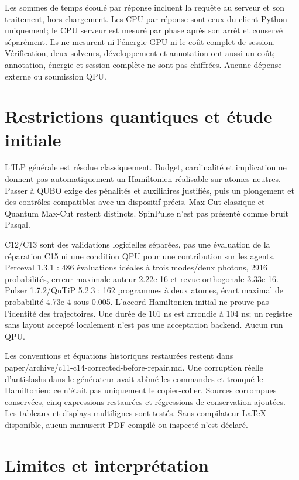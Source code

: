 \documentclass[11pt]{article}
\begin{document}
Les sommes de temps écoulé par réponse incluent la requête au serveur et son traitement, hors chargement. Les CPU par réponse sont ceux du client Python uniquement; le CPU serveur est mesuré par phase après son arrêt et conservé séparément. Ils ne mesurent ni l'énergie GPU ni le coût complet de session. Vérification, deux solveurs, développement et annotation ont aussi un coût; annotation, énergie et session complète ne sont pas chiffrées. Aucune dépense externe ou soumission QPU.

\section{Restrictions quantiques et étude initiale}

L'ILP générale est résolue classiquement. Budget, cardinalité et implication ne donnent pas automatiquement un Hamiltonien réalisable sur atomes neutres. Passer à QUBO exige des pénalités et auxiliaires justifiés, puis un plongement et des contrôles compatibles avec un dispositif précis. Max-Cut classique et Quantum Max-Cut restent distincts. SpinPulse n'est pas présenté comme bruit Pasqal.

C12/C13 sont des validations logicielles séparées, pas une évaluation de la réparation C15 ni une condition QPU pour une contribution sur les agents. Perceval 1.3.1 : 486 évaluations idéales à trois modes/deux photons, 2916 probabilités, erreur maximale auteur 2.22e-16 et revue orthogonale 3.33e-16. Pulser 1.7.2/QuTiP 5.2.3 : 162 programmes à deux atomes, écart maximal de probabilité 4.73e-4 sous 0.005. L'accord Hamiltonien initial ne prouve pas l'identité des trajectoires. Une durée de 101 ns est arrondie à 104 ns; un registre sans layout accepté localement n'est pas une acceptation backend. Aucun run QPU.

Les conventions et équations historiques restaurées restent dans paper/archive/c11-c14-corrected-before-repair.md. Une corruption réelle d'antislashs dans le générateur avait abîmé les commandes et tronqué le Hamiltonien; ce n'était pas uniquement le copier-coller. Sources corrompues conservées, cinq expressions restaurées et régressions de conservation ajoutées. Les tableaux et displays multilignes sont testés. Sans compilateur LaTeX disponible, aucun manuscrit PDF compilé ou inspecté n'est déclaré.

\section{Limites et interprétation}
\end{document}
